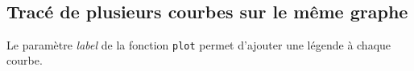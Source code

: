 \documentclass[11pt]{article}
\begin{document}
    \begin{center}
    \end{center}
    { \hspace*{\fill} \\}
    
    \hypertarget{tracuxe9-de-plusieurs-courbes-sur-le-muxeame-graphe}{%
\subsection{Tracé de plusieurs courbes sur le même
graphe}\label{tracuxe9-de-plusieurs-courbes-sur-le-muxeame-graphe}}

Le paramètre \emph{label} de la fonction \texttt{plot} permet d'ajouter
une légende à chaque courbe.
\end{document}
